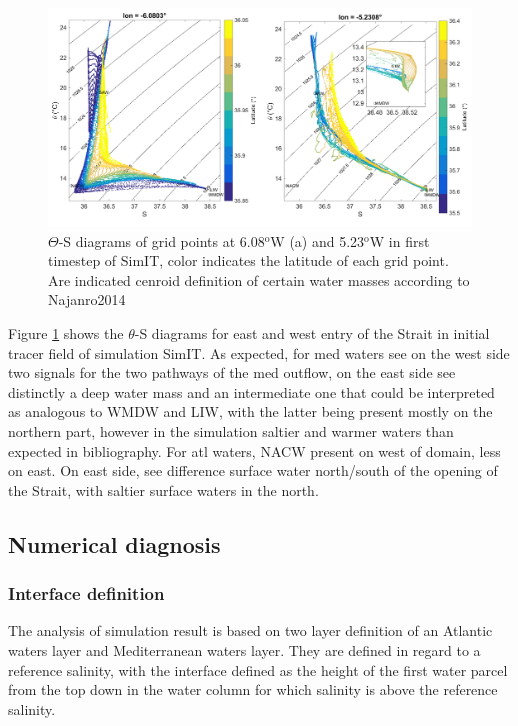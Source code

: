\begin{figure}[!h]
        \includegraphics[width=\textwidth]{./GBR3D/WM_ini_IES.png}
        \caption{$\Theta$-S diagrams of grid points at 6.08$^\text{o}$W (a) and 5.23$^\text{o}$W in first timestep of SimIT, color indicates the latitude of each grid point. Are indicated cenroid definition of certain water masses according to Najanro2014}
        \label{Fig_Ini_WM3D}
\end{figure}


Figure \ref{Fig_Ini_WM3D} shows the $\theta$-S diagrams for east and west entry of the Strait in initial tracer field of simulation SimIT. As expected, for med waters see on the west side two signals for the two pathways of the med outflow, on the east side see distinctly a deep water mass and an intermediate one that could be interpreted as analogous to WMDW and LIW, with the latter being present mostly on the northern part, however in the simulation saltier and warmer waters than expected in bibliography. For atl waters, NACW present on west of domain, less on east. On east side, see difference surface water north/south of the opening of the Strait, with saltier surface waters in the north.




\subsection{Numerical diagnosis}
\label{PartDiag3D}

\subsubsection{Interface definition}

The analysis of simulation result is based on two layer definition of an Atlantic waters layer and Mediterranean waters layer. They are defined in regard to a reference salinity, with the interface defined as the height of the first water parcel from the top down in the water column for which salinity is above the reference salinity.

